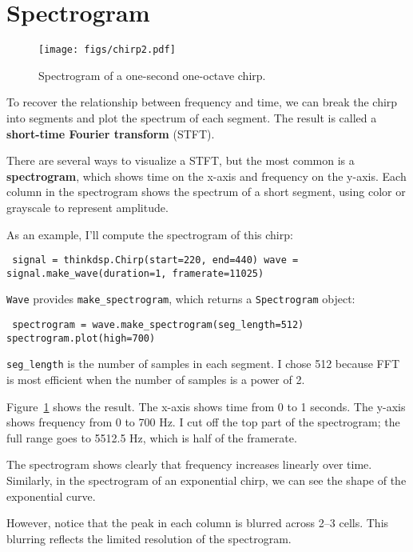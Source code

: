 \documentclass[12pt]{book} \usepackage[width=5.5in,height=8.5in, hmarginratio=3:2,vmarginratio=1:1]{geometry}
\begin{document}
\section{Spectrogram} 

\begin{figure} 

\centerline{\texttt{[image: figs/chirp2.pdf]}} \caption{Spectrogram of a one-second one-octave chirp.} \label{fig.chirp2} \end{figure} 

To recover the relationship between frequency and time, we can break the chirp into segments and plot the spectrum of each segment. The result is called a {\bf short-time Fourier transform} (STFT). 

There are several ways to visualize a STFT, but the most common is a {\bf spectrogram}, which shows time on the x-axis and frequency on the y-axis. Each column in the spectrogram shows the spectrum of a short segment, using color or grayscale to represent amplitude. 

As an example, I'll compute the spectrogram of this chirp: 

\begin{verbatim} signal = thinkdsp.Chirp(start=220, end=440) wave = signal.make_wave(duration=1, framerate=11025) \end{verbatim} 

{\tt Wave} provides \verb"make_spectrogram", which returns a {\tt Spectrogram} object: 

\begin{verbatim} spectrogram = wave.make_spectrogram(seg_length=512) spectrogram.plot(high=700) \end{verbatim} 

\verb"seg_length" is the number of samples in each segment. I chose 512 because FFT is most efficient when the number of samples is a power of 2. 

Figure~\ref{fig.chirp2} shows the result. The x-axis shows time from 0 to 1 seconds. The y-axis shows frequency from 0 to 700 Hz. I cut off the top part of the spectrogram; the full range goes to 5512.5 Hz, which is half of the framerate. 

The spectrogram shows clearly that frequency increases linearly over time. Similarly, in the spectrogram of an exponential chirp, we can see the shape of the exponential curve. 

However, notice that the peak in each column is blurred across 2--3 cells. This blurring reflects the limited resolution of the spectrogram. 
\end{document}
